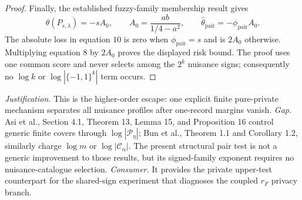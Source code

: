 \documentclass{article}
\begin{document}
\begin{proof}
Finally, the established fuzzy-family membership result gives
\[
 \theta(P_{s,\lambda})=-sA_0,
 \qquad
 A_0=\frac{ab}{1/4-a^2},
 \qquad
 \widehat\theta_{\mathrm{pair}}=-\phi_{\mathrm{pair}}A_0. \tag{10}
\]
The absolute loss in equation \(10\) is zero when \(\phi_{\mathrm{pair}}=s\) and is \(2A_0\) otherwise.  Multiplying equation \(8\) by \(2A_0\) proves the displayed risk bound.  The proof uses one common score and never selects among the \(2^k\) nuisance signs; consequently no \(\log k\) or \(\log|\{-1,1\}^k|\) term occurs.
\end{proof}
\par\smallskip\noindent \textit{Justification.} This is the higher-order escape: one explicit finite pure-private mechanism separates all nuisance profiles after one-record margins vanish. \textit{Gap.} Asi et al., Section 4.1, Theorem 13, Lemma 15, and Proposition 16 control generic finite covers through \(\log|\mathcal P_\eta|\); Bun et al., Theorem 1.1 and Corollary 1.2, similarly charge \(\log m\) or \(\log|\mathcal C_\alpha|\). The present structural pair test is not a generic improvement to those results, but its signed-family exponent requires no nuisance-catalogue selection. \textit{Consumer.} It provides the private upper-test counterpart for the shared-sign experiment that diagnoses the coupled \(r_F\) privacy branch.
\end{document}
